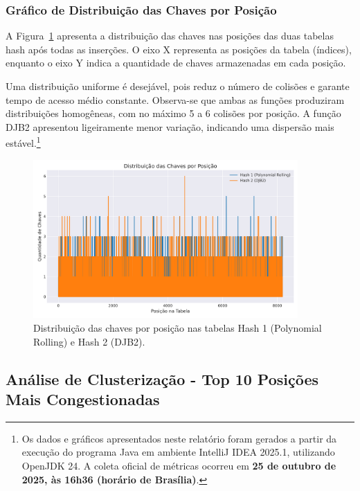 \documentclass[12pt,a4paper]{abntex2}
\begin{document}
\subsubsection{Gráfico de Distribuição das Chaves por Posição}

A Figura~\ref{fig:distribuicao_chaves} apresenta a distribuição das chaves nas posições das duas tabelas hash após todas as inserções. O eixo X representa as posições da tabela (índices), enquanto o eixo Y indica a quantidade de chaves armazenadas em cada posição.

Uma distribuição uniforme é desejável, pois reduz o número de colisões e garante tempo de acesso médio constante. Observa-se que ambas as funções produziram distribuições homogêneas, com no máximo 5 a 6 colisões por posição. A função DJB2 apresentou ligeiramente menor variação, indicando uma dispersão mais estável.\footnote{Os dados e gráficos apresentados neste relatório foram gerados a partir da execução do programa Java em ambiente IntelliJ IDEA 2025.1, utilizando OpenJDK 24. A coleta oficial de métricas ocorreu em \textbf{25 de outubro de 2025, às 16h36 (horário de Brasília)}.}

\begin{figure}[H]
  \centering
  \includegraphics[width=0.9\textwidth]{grafico_distribuicao_chaves.png}
  \caption{Distribuição das chaves por posição nas tabelas Hash 1 (Polynomial Rolling) e Hash 2 (DJB2).}
  \label{fig:distribuicao_chaves}
\end{figure}

\subsection{Análise de Clusterização - Top 10 Posições Mais Congestionadas}
\end{document}
